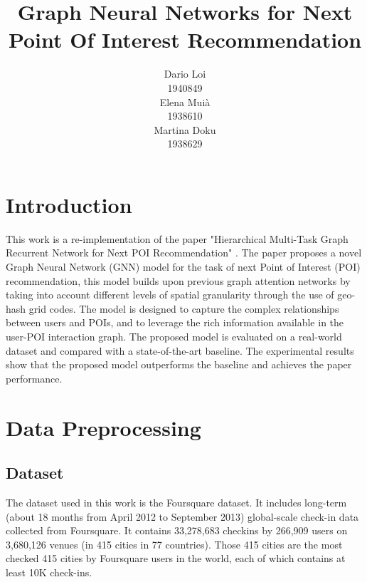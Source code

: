 \documentclass[twocolumn,twoside]{article}
\title{Graph Neural Networks for Next Point Of Interest Recommendation
}
\author{
  Dario Loi\\
  1940849\\
   \And
  Elena Muià \\
  1938610 \\
  \And
  Martina Doku \\
  1938629\\
}
\begin{document}


\section{Introduction}
This work is a re-implementation of the paper "Hierarchical Multi-Task Graph Recurrent Network for Next POI Recommendation" \cite{main_paper}.
The paper proposes a novel Graph Neural Network (GNN) model for the task of
next Point of Interest (POI) recommendation, this model builds upon previous graph attention networks\cite{UPGAT} by taking into 
account different levels of spatial granularity through the use of geo-hash grid codes. The model is designed to
capture the complex relationships between users and POIs, and to
leverage the rich information available in the user-POI interaction
graph. The proposed model is evaluated on a real-world dataset and
compared with a state-of-the-art baseline. The experimental results
show that the proposed model outperforms the baseline and
achieves the paper performance.


\section{Data Preprocessing}
\subsection{Dataset}
The dataset used in this work is the Foursquare dataset\cite{foursquare}. It includes
long-term (about 18 months from April 2012 to September 2013) global-scale
check-in data collected from Foursquare. It contains 33,278,683 checkins by
266,909 users on 3,680,126 venues (in 415 cities in 77 countries).
Those 415 cities are the most checked 415 cities by Foursquare users in the world,
each of which contains at least 10K check-ins.
\end{document}
